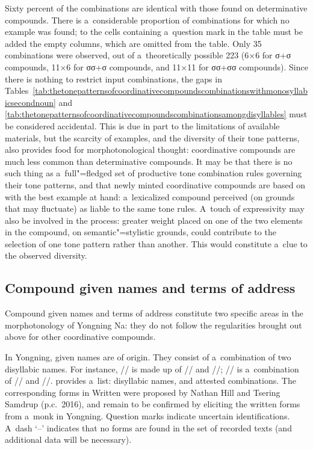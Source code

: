 Sixty percent of the combinations are identical with those found on
determinative compounds. There is a~considerable proportion of combinations for which no example was found; to the cells containing a~{question} mark in the table must be added the empty columns, which are omitted
from the table. Only 35 combinations were observed, out of a~theoretically possible
223 (6×6 for σ+σ compounds, 11×6 for σσ+σ compounds, and 11×11 for σσ+σσ compounds). Since there is nothing to restrict input combinations, the gaps in Tables~\ref{tab:thetonepatternsofcoordinativecompoundscombinationswithmonosyllabicsecondnoun}
and
\ref{tab:thetonepatternsofcoordinativecompoundscombinationsamongdisyllables} must be considered accidental. This is due in part to the limitations of available materials, but the scarcity of examples, and the diversity of their tone patterns, also provides food for morphotonological thought: coordinative compounds are much less common than
determinative compounds. It may be that there is no such thing as a~full"=fledged set of productive tone combination rules governing their tone patterns, and that newly minted coordinative compounds are based on  with the best example at hand: a~lexicalized compound perceived (on grounds that may fluctuate) as liable to the same tone rules. A~touch of expressivity may also be involved in the process: greater weight placed on one of the two elements in the compound, on semantic"=stylistic grounds, could contribute to the selection of one tone pattern rather than another. This would constitute a~clue to the observed diversity. 


\subsection{Compound given names and terms of address}
\label{sec:anindependentsetoffactscompoundgivennamesandtermsofaddress}

Compound given names and terms of address constitute two specific areas in the morphotonology of Yongning Na: they do not follow the regularities brought out above for other coordinative compounds.

In Yongning, given names are of  origin. They consist of a~combination of two disyllabic names. For instance, // is made up of // and //; // is a~combination of // and //.  provides a~list: disyllabic names, and attested combinations. The corresponding forms in Written  were proposed by Nathan Hill and Tsering Samdrup (p.c.\ 2016), and remain to be confirmed by eliciting the written forms from a~monk in Yongning. Question marks indicate uncertain identifications. A~dash ‘--’ indicates that no forms are found in the set of recorded texts (and additional data will be necessary).


